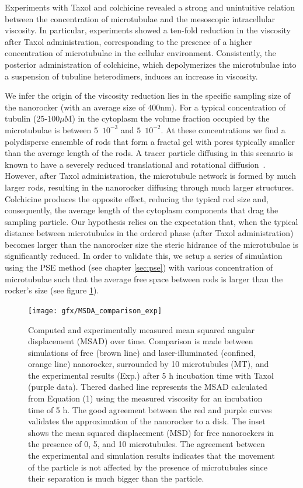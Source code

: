 \documentclass[twoside,openright,titlepage,numbers=noenddot,%
headinclude,footinclude,cleardoublepage=empty,abstract=on,
BCOR=5mm,fontsize=11pt, dvipsnames, paper=b5
]{scrreprt}
\begin{document}
Experiments with Taxol and colchicine revealed a strong and unintuitive relation between the concentration of microtubulae and the mesoscopic intracellular viscosity. In particular, experiments showed a ten-fold reduction in the viscosity after Taxol administration, corresponding to the presence of a higher concentration of microtubulae in the cellular environment. Consistently, the posterior administration of colchicine, which depolymerizes the microtubulae into a suspension of tubuline heterodimers, induces an increase in viscosity.

We infer the origin of the viscosity reduction lies in the specific sampling size of the nanorocker (with an average size of $400$nm). For a typical concentration of tubulin ($25$-$100\mu$M) in the cytoplasm the volume fraction occupied by the microtubulae is between $5$~$10^{-3}$ and $5$~$10^{-2}$. At these concentrations we find a polydisperse ensemble of rods that form a fractal gel with pores typically smaller than the average length of the rods. A tracer particle diffusing in this scenario is known to have a severely reduced translational and rotational diffusion~\cite{Solomon2010,Alcazar2018}. However, after Taxol administration, the microtubule network is formed by much larger rods, resulting in the nanorocker diffusing through much larger structures. Colchicine produces the opposite effect, reducing the typical rod size and, consequently, the average length of the cytoplasm components that drag the sampling particle. Our hypothesis relies on the expectation that, when the typical distance between microtubules in the ordered phase (after Taxol administration) becomes larger than the nanorocker size the steric hidrance of the microtubulae is significantly reduced. In order to validate this, we setup a series of simulation using the \gls{PSE} method (see chapter \ref{sec:pse}) with various concentration of microtubulae such that the average free space between rods is larger than the rocker's size (see figure \ref{fig:msad}).
\begin{figure}[H]
  \centering
  \texttt{[image: gfx/MSDA\_comparison\_exp]}
  \caption[ ]{Computed and experimentally measured mean squared angular displacement (MSAD) over time. Comparison is made between simulations of free (brown line) and laser-illuminated (confined, orange line) nanorocker, surrounded by 10 microtubules (MT), and the experimental results (Exp.) after 5 h incubation time with Taxol (purple data). Thered dashed line represents the MSAD calculated from Equation (1) using the measured viscosity for an incubation time of 5 h. The good agreement between the red and purple curves validates the approximation of the nanorocker to a disk. The inset shows the mean squared displacement (MSD) for free nanorockers in the presence of 0, 5, and 10 microtubules. The agreement between the experimental and simulation results indicates that the movement of the particle is not affected by the presence of microtubules since their separation is much bigger than the particle.}
  \label{fig:msad}
\end{figure}
\end{document}
